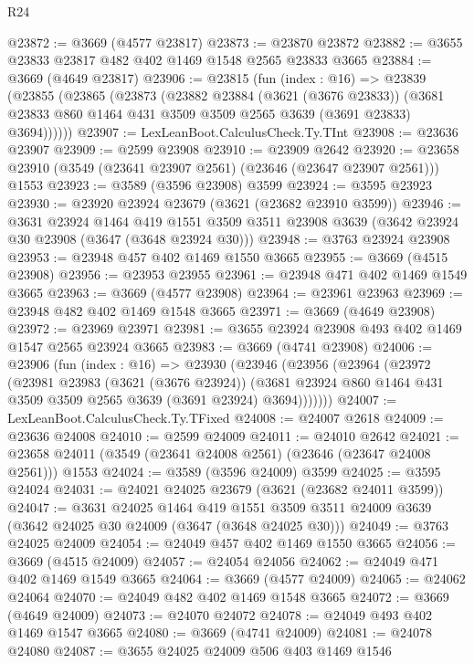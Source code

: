 \begin{lexlean}{R24}
\begin{coremodule}
@23872 := @3669 (@4577 @23817)
@23873 := @23870 @23872
@23882 := @3655 @23833 @23817 @482 @402 @1469 @1548 @2565 @23833 @3665
@23884 := @3669 (@4649 @23817)
@23906 := @23815
    (fun (index : @16) =>
    @23839
      (@23855
        (@23865
          (@23873
            (@23882
              @23884
              (@3621 (@3676 @23833))
              (@3681 @23833 @860 @1464 @431 @3509 @3509 @2565 @3639 (@3691 @23833) @3694))))))
@23907 := LexLeanBoot.CalculusCheck.Ty.TInt
@23908 := @23636 @23907
@23909 := @2599 @23908
@23910 := @23909 @2642
@23920 := @23658 @23910 (@3549 (@23641 @23907 @2561) (@23646 (@23647 @23907 @2561))) @1553
@23923 := @3589 (@3596 @23908) @3599
@23924 := @3595 @23923
@23930 := @23920 @23924 @23679 (@3621 (@23682 @23910 @3599))
@23946 := @3631
    @23924
    @1464
    @419
    @1551
    @3509
    @3511
    @23908
    @3639
    (@3642 @23924 @30 @23908 (@3647 (@3648 @23924 @30)))
@23948 := @3763 @23924 @23908
@23953 := @23948 @457 @402 @1469 @1550 @3665
@23955 := @3669 (@4515 @23908)
@23956 := @23953 @23955
@23961 := @23948 @471 @402 @1469 @1549 @3665
@23963 := @3669 (@4577 @23908)
@23964 := @23961 @23963
@23969 := @23948 @482 @402 @1469 @1548 @3665
@23971 := @3669 (@4649 @23908)
@23972 := @23969 @23971
@23981 := @3655 @23924 @23908 @493 @402 @1469 @1547 @2565 @23924 @3665
@23983 := @3669 (@4741 @23908)
@24006 := @23906
    (fun (index : @16) =>
    @23930
      (@23946
        (@23956
          (@23964
            (@23972
              (@23981
                @23983
                (@3621 (@3676 @23924))
                (@3681 @23924 @860 @1464 @431 @3509 @3509 @2565 @3639 (@3691 @23924) @3694)))))))
@24007 := LexLeanBoot.CalculusCheck.Ty.TFixed
@24008 := @24007 @2618
@24009 := @23636 @24008
@24010 := @2599 @24009
@24011 := @24010 @2642
@24021 := @23658 @24011 (@3549 (@23641 @24008 @2561) (@23646 (@23647 @24008 @2561))) @1553
@24024 := @3589 (@3596 @24009) @3599
@24025 := @3595 @24024
@24031 := @24021 @24025 @23679 (@3621 (@23682 @24011 @3599))
@24047 := @3631
    @24025
    @1464
    @419
    @1551
    @3509
    @3511
    @24009
    @3639
    (@3642 @24025 @30 @24009 (@3647 (@3648 @24025 @30)))
@24049 := @3763 @24025 @24009
@24054 := @24049 @457 @402 @1469 @1550 @3665
@24056 := @3669 (@4515 @24009)
@24057 := @24054 @24056
@24062 := @24049 @471 @402 @1469 @1549 @3665
@24064 := @3669 (@4577 @24009)
@24065 := @24062 @24064
@24070 := @24049 @482 @402 @1469 @1548 @3665
@24072 := @3669 (@4649 @24009)
@24073 := @24070 @24072
@24078 := @24049 @493 @402 @1469 @1547 @3665
@24080 := @3669 (@4741 @24009)
@24081 := @24078 @24080
@24087 := @3655 @24025 @24009 @506 @403 @1469 @1546

\end{coremodule}
\end{lexlean}
